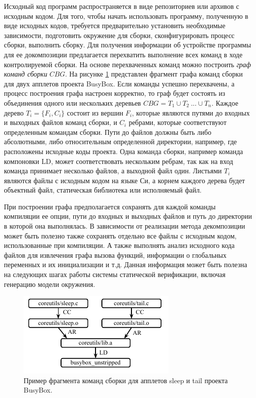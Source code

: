 \documentclass[%
candidate,     %
href,        %
colorlinks,  %
]{disser}
\begin{document}
Исходный код программ распространяется в виде репозиториев или архивов с исходным кодом.
Для того, чтобы начать использовать программу, полученную в виде исходных кодов, требуется предварительно установить необходимые зависимости, подготовить окружение для сборки, сконфигурировать процесс сборки, выполнить сборку.
Для получения информации об устройстве программы для ее докомпозиции предлагается перехватить выполнение всех команд в ходе контролируемой сборки.
На основе перехваченных команд можно построить \textit{граф команд сборки} $CBG$.
На рисунке \ref{figure:cbg} представлен фрагмент графа команд сборки для двух апплетов проекта BusyBox.
Если команды успешно перехвачены, а процесс построения графа настроен корректно, то граф будет состоять из объединения одного или нескольких деревьев $CBG = T_1 \cup T_2~...\cup T_n$.
Каждое дерево $T_i = \{F_i, C_i\}$ состоит из вершин $F_i$, которые являются путями до входных и выходных файлов команд сборки, и $C_i$ ребрами, которые соответствуют определенным командам сборки.
Пути до файлов должны быть либо абсолютными, либо относительным определенной директории, например, где расположены исходные коды проекта.
Одна команда сборки, например команда компоновки LD, может соответствовать нескольким ребрам, так как на вход команда принимает несколько файлов, а выходной файл один.
Листьями $T_i$ являются файлы с исходным кодом на языке Си, а корнем каждого дерева будет объектный файл, статическая библиотека или исполняемый файл. 

При построении графа предполагается сохранять для каждой команды компиляции ее опции, пути до входных и выходных файлов и путь до директории в которой она выполнялась.
В зависимости от реализации метода декомпозиции может быть полезно также сохранять отдельно все файлы с исходным кодом, использованные при компиляции.
А также выполнять анализ исходного кода файлов для извлечения графа вызова функций, информации о глобальных переменных и их инициализации и т.д.
Данная информация может быть полезна на следующих шагах работы системы статической верификации, включая генерацию модели окружения.

\begin{figure}
\centering
\includegraphics[scale=2.0]{cbg}
\caption{Пример фрагмента команд сборки для апплетов sleep и tail проекта BusyBox.}
\label{figure:cbg}
\end{figure}
\end{document}
